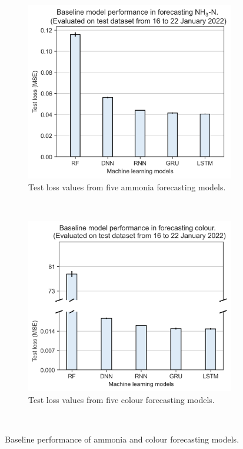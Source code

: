 \begin{figure}[!ht]
  \centering
  \begin{subfigure}[t]{0.75\textwidth}
    \includegraphics[width=\linewidth]{imgs/results/baseline-models-nh3.png}
    \caption{Test loss values from five ammonia forecasting models.} \label{fig:baseline-nh3}
  \end{subfigure}\\
  \vspace{2em}%
  \begin{subfigure}[t]{0.75\textwidth}
    \includegraphics[width=\linewidth]{imgs/results/baseline-models-colour.png}
    \caption{Test loss values from five colour forecasting models.} \label{fig:baseline-colour}
  \end{subfigure}\\
\caption{Baseline performance of ammonia and colour forecasting models.} \label{fig:baseline-performance}
\end{figure}

